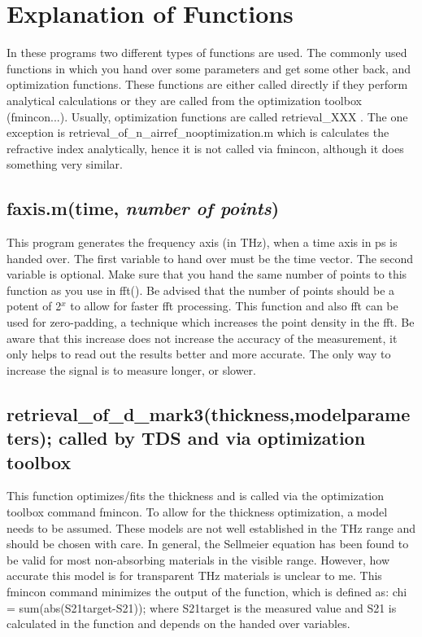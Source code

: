 \documentclass[12pt]{article}
\begin{document}
\section{Explanation of Functions}

In these programs two different types of functions are used. The commonly used functions in which you hand over some parameters and get some other back, and optimization functions. These functions are either called directly if they perform analytical calculations or they are called from the optimization toolbox (fmincon\@...).  Usually, optimization functions are called retrieval\_XXX . The one exception is retrieval\_of\_n\_airref\_nooptimization.m which is calculates the refractive index analytically, hence it is not called via fmincon, although it does something very similar. 


\subsection{faxis.m(\textbf{time}, \textit{number of points})}
This program generates the frequency axis (in THz), when a time axis in ps is handed over. The first variable to hand over must be the time vector. The second variable is optional. Make sure that you hand the same number of points to this function as you use in fft(). Be advised that the number of points should be a potent of 2$^x$ to allow for faster fft processing. This function and also fft can be used for zero-padding, a technique which increases the point density in the fft. Be aware that this increase does not increase the accuracy of the measurement, it only helps to read out the results better and more accurate. The only way to increase the signal is to measure longer, or slower. 

\subsection{retrieval\_of\_d\_mark3(\textbf{thickness,modelparameters}); called by TDS and \pellet via optimization toolbox}
This function optimizes/fits the thickness and is called via the optimization toolbox command fmincon. To allow for the thickness optimization, a model needs to be assumed. These models are not well established in the THz range and should be chosen with care. In general, the Sellmeier equation has been found to be valid for most non-absorbing materials in the visible range. However, how accurate this model is for transparent THz materials is unclear to me. 
This fmincon command minimizes the output of the function, which is defined as:
chi =  sum(abs(S21target-S21));
where S21target is the measured value and S21 is calculated in the function and depends on the handed over variables.
\end{document}
